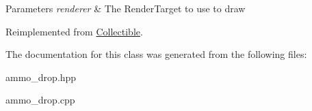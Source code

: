 \begin{DoxyParams}{Parameters}
{\em renderer} & The Render\+Target to use to draw \\
\hline
\end{DoxyParams}


Reimplemented from \mbox{\hyperlink{class_collectible_a4bd92e0f368cd712b86e3ebabc3599f1}{Collectible}}.



The documentation for this class was generated from the following files\+:\begin{DoxyCompactItemize}
\item 
ammo\+\_\+drop.\+hpp\item 
ammo\+\_\+drop.\+cpp\end{DoxyCompactItemize}
